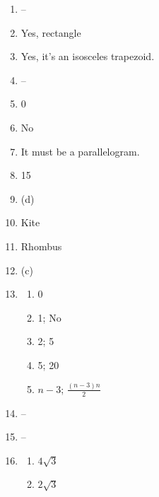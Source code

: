 \documentclass{article}
\begin{document}
\begin{enumerate}
\begin{enumerate}
	\end{enumerate}
	
\item --

\item Yes, rectangle

\item Yes, it's an isosceles trapezoid.

\item --

\item 0

\item No

\item It must be a parallelogram.

\item 15

\item (d)

\item Kite

\item Rhombus

\item (c)

\item

	\begin{enumerate}
	
	\item 0
	
	\item 1; No
	
	\item 2; 5
	
	\item 5; 20
	
	\item $n - 3$; $\frac{(n - 3)n}{2}$
	
	\end{enumerate}
	
\item --

\item --

\item

	\begin{enumerate}
	
	\item $4 \sqrt{3}$
	
	\item $2 \sqrt{3}$
	

\end{enumerate}
\end{enumerate}
\end{document}

